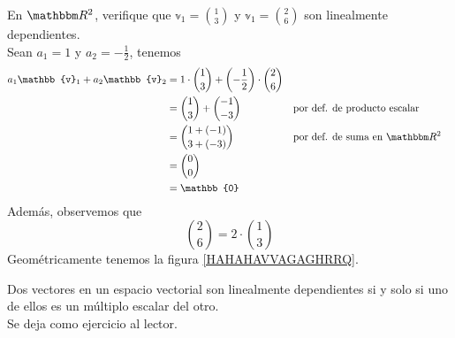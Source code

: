 \begin{example}
    En $\RR[2]$, verifique que $\displaystyle \mathbb{v}_1 = \binom{1}{3}$ y $\displaystyle \mathbb{v}_1 = \binom{2}{6}$ son linealmente dependientes. \\
    \solucion Sean $a_1 = 1$ y $\displaystyle a_2 = -\frac{1}{2}$, tenemos
    \begin{align*}
        a_1\mathbb{v}_1 + a_2\mathbb{v}_2 & = 1 \cdot \binom{1}{3} + \left( -\frac{1}{2} \right) \cdot \binom{2}{6} \\
        & = \binom{1}{3} + \binom{-1}{-3} && \text{por def. de producto escalar} \\
        & = \binom{1+(-1)}{3+(-3)} && \text{por def. de suma en } \RR[2] \\
        & = \binom{0}{0} \\
        & = \mathbb{0}
    \end{align*}
    Además, observemos que
    $$\binom{2}{6} = 2 \cdot \binom{1}{3}$$
    Geométricamente tenemos la figura \ref{HAHAHAVVAGAGHRRQ}.
\end{example}

\begin{theorem}
    Dos vectores en un espacio vectorial son linealmente dependientes si y solo si uno de ellos es un múltiplo escalar del otro. \\
    \demostracion Se deja como ejercicio al lector.
\end{theorem}

